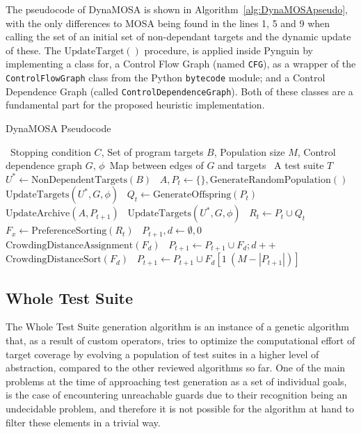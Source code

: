\documentclass[%
  chapterprefix=false,%
  open=right,%
  twoside=true,%
  paper=a4,%
  logofile={Figures/logo.png},%
  thesistype=master,%
  UKenglish,%
]{se2thesis}
\newcommand{\classname}[1]{\texttt{#1}}
\begin{document}
The pseudocode of DynaMOSA is shown in Algorithm~\ref{alg:DynaMOSApseudo}, with the only differences to MOSA being found in the lines 1, 5 and 9 when calling the set of an initial set of non-dependant targets and the dynamic update of these.
The \(\text{UpdateTarget}()\) procedure, is applied inside Pynguin by implementing a class for, a Control Flow Graph (named \classname{CFG}), as a wrapper of the \classname{ControlFlowGraph} class from the Python \classname{bytecode} module; and a Control Dependence Graph (called \classname{ControlDependenceGraph}).
Both of these classes are a fundamental part for the proposed heuristic implementation.

\begin{algorithm}[h!]
  \centering
  \caption{DynaMOSA Pseudocode}\label{alg:DynaMOSApseudo}
  \begin{algorithmic}[1]
    \Require~Stopping condition \(C\), Set of program targets \(B\), Population size \(M\), Control dependence graph \(G\), \(\phi\)~Map between edges of \(G\) and targets
    \Ensure~A test suite \(T\)
    \State~\(U^* \gets \text{NonDependentTargets}(B)\)
    \State~\(A, P_t \gets \{\}, \text{GenerateRandomPopulation}()\)
    \State~\(\text{UpdateTargets}(U^*, G, \phi)\)
      \State~\(Q_t \gets \text{GenerateOffspring}(P_t)\)
      \State~\(\text{UpdateArchive}(A, P_{t+1})\)
      \State~\(\text{UpdateTargets}(U^*, G, \phi)\)
      \State~\(R_t \gets P_t \cup Q_t\)
      \State~\(F_x \gets \text{PreferenceSorting}(R_t)\)
      \State~\(P_{t+1}, d \gets \emptyset, 0\)
        \State~\(\text{CrowdingDistanceAssignment}(F_d)\)
        \State~\(P_{t+1} \gets P_{t+1} \cup F_d; d++\)
      \EndWhile\@
      \State~\(\text{CrowdingDistanceSort}(F_d)\)
      \State~\(P_{t+1} \gets P_{t+1} \cup F_d[1\: (M - |P_{t+1}|)]\)
    \EndWhile\@
  \end{algorithmic}
\end{algorithm}

\newpage

\subsection{Whole Test Suite}

The Whole Test Suite generation algorithm is an instance of a genetic algorithm that, as a result of custom operators, tries to optimize the computational effort of target coverage by evolving a population of test suites in a higher level of abstraction, compared to the other reviewed algorithms so far.
One of the main problems at the time of approaching test generation as a set of individual goals, is the case of encountering unreachable guards due to their recognition being an undecidable problem, and therefore it is not possible for the algorithm at hand to filter these elements in a trivial way.
\end{document}
